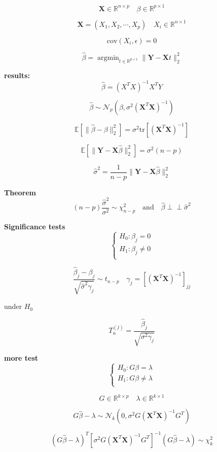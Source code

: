 \documentclass[12pt,a4paper]{article}
\DeclareMathOperator*{\argmin}{argmin}
\newcommand{\indep}{\perp \!\!\! \perp}
\begin{document}
\[
\mathbf{X} \in \mathbb{R}^{n\times p} \quad \beta \in \mathbb{R}^{p\times 1} \]

\[
\mathbf{X} = (X_1,X_2,\cdots,X_p) \quad X_i \in \mathbb{R}^{n \times 1}\]

\[
 \mathrm{cov}(X_i,\epsilon) = 0
\]


\[
\hat{\beta} = \argmin_{t \in \mathbb{R}^{p \times 1}} \|\mathbf{Y} - \mathbf{X}t \|^2_2
\]

\textbf{results:}
\[
\hat{\beta} = (X^TX)^{-1}X^TY
\]

\[
\hat{\beta} \sim \mathcal{N}_p(\beta,\sigma^2(\mathbf{X}^T\mathbf{X})^{-1})
\]

\[
\mathbb{E}[\|\hat{\beta}-\beta\|^2_2] = \sigma^2 \mathrm{tr}\left[ (\mathbf{X}^T\mathbf{X})^{-1}\right]
\]

\[
\mathbb{E}[\|\mathbf{Y}-\mathbf{X}\hat{\beta}\|^2_2] = \sigma^2 (n-p)
\]

\[
\hat{\sigma}^2 = \frac{1}{n-p}\|\mathbf{Y}-\mathbf{X}\hat{\beta}\|^2_2
\]

\textbf{Theorem}
\[
(n-p)\frac{\hat{\sigma}^2}{\sigma^2} \sim \chi^2_{n-p}\quad  \mbox{and} \quad \hat{\beta} \indep \hat{\sigma}^2
\]

\textbf{Significance tests}
\[
\begin{cases}
H_0: \beta_j = 0 \\
H_1: \beta_j \neq 0 \\
\end{cases}
\]

\[
\frac{\hat{\beta}_j-\beta_j}{\sqrt{\hat{\sigma}^2 \gamma_j}} \sim t_{n-p} \quad \gamma_j = \left[ (\mathbf{X}^T\mathbf{X})^{-1}\right]_{jj}
\]

under $H_0$

\[
T_n^{(j)} = \frac{\hat{\beta}_j}{\sqrt{\sigma^2 \gamma_j}} 
\]

\textbf{more test}
\[
\begin{cases}
H_0: G\beta = \lambda \\
H_1: G\beta \neq \lambda \\
\end{cases}
\]

\[
G \in \mathbb{R}^{k \times p} \quad \lambda \in \mathbb{R}^{k \times 1}
\]

\[
G\hat{\beta} - \lambda \sim \mathcal{N}_k(0,\sigma^2G(\mathbf{X}^T\mathbf{X})^{-1}G^T)
\]

\[
(G\hat{\beta} - \lambda)^T\left[\sigma^2G(\mathbf{X}^T\mathbf{X})^{-1}G^T\right]^{-1}(G\hat{\beta} - \lambda) \sim \chi^2_k
\]
\end{document}

